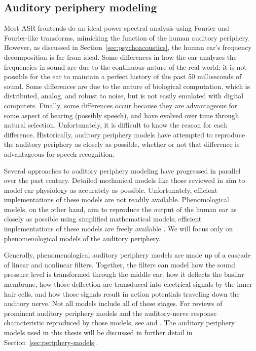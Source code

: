 \subsection{Auditory periphery modeling}

Most ASR frontends do an ideal
power spectral analysis
using Fourier and Fourier-like transforms,
mimicking the function
of the human auditory periphery.
However, as discussed in Section~\ref{sec:psychoacoustics},
the human ear's frequency decomposition
is far from ideal.
Some differences in how the ear
analyzes the frequencies in sound
are due to the continuous nature
of the real world;
it is not possible for the ear
to maintain a perfect history
of the past 50 milliseconds of sound.
Some differences are due to
the nature of biological computation,
which is distributed, analog, and robust to noise,
but is not easily emulated with digital computers.
Finally, some differences
occur because they are advantageous
for some aspect of hearing
(possibly speech),
and have evolved over time through natural selection.
Unfortunately, it is difficult to know
the reason for each difference.
Historically, auditory periphery models
have attempted to reproduce
the auditory periphery as closely as possible,
whether or not that difference is advantageous
for speech recognition.

Several approaches to auditory periphery modeling
have progressed in parallel over the past century.
Detailed mechanical models
like those reviewed in \citet{ni2014}
aim to model ear physiology
as accurately as possible.
Unfortunately, efficient implementations
of these models are not readily available.
Phenomological models, on the other hand,
aim to reproduce the output
of the human ear
as closely as possible
using simplified mathematical models;
efficient implementations of these
models are freely available
\citep{fontaine2011}.
We will focus only on phenomenological
models of the auditory periphery.

Generally, phenomenological auditory periphery models
are made up of a cascade of linear and nonlinear filters.
Together, the filters can model
how the sound pressure level
is transformed through the middle ear,
how it deflects the basilar membrane,
how those deflection are transduced
into electrical signals
by the inner hair cells,
and how those signals result in
action potentials traveling down
the auditory nerve.
Not all models include all of these stages.
For reviews of prominent
auditory periphery models and
the auditory-nerve response characteristic
reproduced by those models,
see \citet{lopez2005}
and \citet{lyon2010}.
The auditory periphery models used
in this thesis will be discussed
in further detail in
Section~\ref{sec:periphery-models}.

